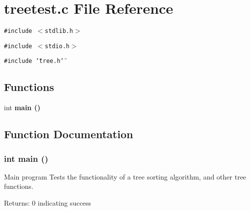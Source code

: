 \section{treetest.c File Reference}
\label{treetest_8c}
{\tt \#include $<$stdlib.h$>$}\par
{\tt \#include $<$stdio.h$>$}\par
{\tt \#include \char`\"{}tree.h\char`\"{}}\par
\subsection*{Functions}
\begin{CompactItemize}
\item 
int \bf{main} ()
\end{CompactItemize}


\subsection{Function Documentation}
\subsubsection{\setlength{\rightskip}{0pt plus 5cm}int main ()}\label{treetest_8c_446c6b9a1a4dbab517fbb760870458a3}


Main program Tests the functionality of a tree sorting algorithm, and other tree functions. \begin{Desc}
\item[Returns:]0 indicating success \end{Desc}
